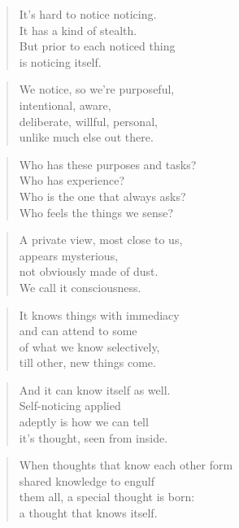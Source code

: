 \documentclass[14pt,a4paper]{article}
\begin{document}
\begin{verse}
It’s hard to notice noticing.\\
It has a kind of stealth.\\
But prior to each noticed thing\\
is noticing itself.
\end{verse}

\begin{verse}
We notice, so we’re purposeful,\\
intentional, aware,\\
deliberate, willful, personal,\\
unlike much else out there.
\end{verse}

\begin{verse}
Who has these purposes and tasks?\\
Who has experience?\\
Who is the one that always asks?\\
Who feels the things we sense?
\end{verse}

\begin{verse}
A private view, most close to us,\\
appears mysterious,\\
not obviously made of dust.\\
We call it consciousness.
\end{verse}

\begin{verse}
It knows things with immediacy\\
and can attend to some\\
of what we know selectively,\\
till other, new things come.
\end{verse}

\begin{verse}
And it can know itself as well.\\
Self-noticing applied\\
adeptly is how we can tell\\
it’s thought, seen from inside.
\end{verse}

\begin{verse}
When thoughts that know each other form\\
shared knowledge to engulf\\
them all, a special thought is born:\\
a thought that knows itself.
\end{verse}
\end{document}
